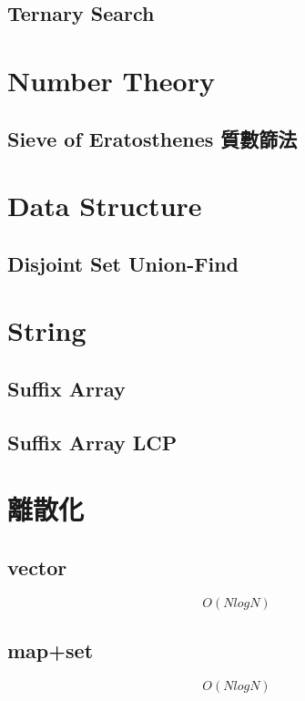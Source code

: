     \subsection{Ternary Search}
        
\section{Number Theory}
    \subsection{Sieve of Eratosthenes 質數篩法}
        

\section{Data Structure}
    \subsection{Disjoint Set Union-Find}
        

\section{String}
    \subsection{Suffix Array}
        
    \subsection{Suffix Array LCP}
        

\section{離散化}
    \subsection{vector}\[O(NlogN)\]
        
    \subsection{map+set}\[O(NlogN)\]
        